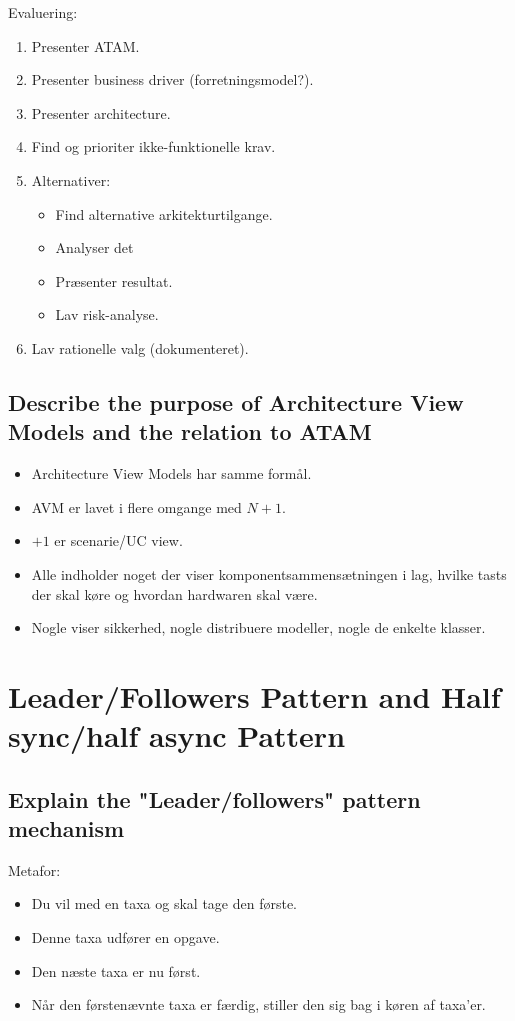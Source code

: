 \documentclass{article}
\begin{document}
Evaluering:
\vspace{-10pt}
\begin{enumerate}
	\item Presenter ATAM.
	\item Presenter business driver (forretningsmodel?).
	\item Presenter architecture.
	\item Find og prioriter ikke-funktionelle krav.
	\item Alternativer:
	\begin{itemize}
	 	\item Find alternative arkitekturtilgange.	
	 	\item Analyser det
		\item Præsenter resultat.
		\item Lav risk-analyse.
	 \end{itemize} 

	\item Lav rationelle valg (dokumenteret).
\end{enumerate}

\subsection{Describe the purpose of Architecture View Models and the relation to ATAM}

\begin{itemize}
	\item Architecture View Models har samme formål.
	\item AVM er lavet i flere omgange med $N+1$.
	\item $+1$ er scenarie/UC view.
	\item Alle indholder noget der viser komponentsammensætningen i lag, hvilke tasts der skal køre og hvordan hardwaren skal være.
	\item Nogle viser sikkerhed, nogle distribuere modeller, nogle de enkelte klasser.
\end{itemize}











\newpage
\section{Leader/Followers Pattern and Half sync/half async Pattern}

\subsection{Explain the "Leader/followers" pattern mechanism}
Metafor:
\vspace{-10pt}
\begin{itemize}
	\item Du vil med en taxa og skal tage den første.
	\item Denne taxa udfører en opgave.
	\item Den næste taxa er nu først.
	\item Når den førstenævnte taxa er færdig, stiller den sig bag i køren af taxa'er.
\end{itemize}
\end{document}
